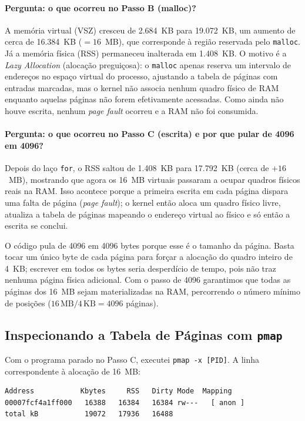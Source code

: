 \documentclass[11pt,a4paper]{article}
\begin{document}
\paragraph{Pergunta: o que ocorreu no Passo B (malloc)?}
A memória virtual (VSZ) cresceu de 2.684~KB para 19.072~KB, um aumento de cerca de 16.384~KB
($=16$~MB), que corresponde à região reservada pelo \texttt{malloc}. Já a memória física (RSS)
permaneceu inalterada em 1.408~KB. O motivo é a \emph{Lazy Allocation} (alocação preguiçosa): o
\texttt{malloc} apenas reserva um intervalo de endereços no espaço virtual do processo, ajustando a
tabela de páginas com entradas marcadas, mas o kernel não associa nenhum quadro físico de RAM
enquanto aquelas páginas não forem efetivamente acessadas. Como ainda não houve escrita, nenhum
\emph{page fault} ocorreu e a RAM não foi consumida.

\paragraph{Pergunta: o que ocorreu no Passo C (escrita) e por que pular de 4096 em 4096?}
Depois do laço \texttt{for}, o RSS saltou de 1.408~KB para 17.792~KB (cerca de $+16$~MB), mostrando
que agora os 16~MB virtuais passaram a ocupar quadros físicos reais na RAM. Isso acontece porque a
primeira escrita em cada página dispara uma falta de página (\emph{page fault}); o kernel então
aloca um quadro físico livre, atualiza a tabela de páginas mapeando o endereço virtual ao físico e
só então a escrita se conclui.

O código pula de 4096 em 4096 bytes porque esse é o tamanho da página. Basta tocar um único byte de
cada página para forçar a alocação do quadro inteiro de 4~KB; escrever em todos os bytes seria
desperdício de tempo, pois não traz nenhuma página física adicional. Com o passo de 4096 garantimos
que todas as páginas dos 16~MB sejam materializadas na RAM, percorrendo o número mínimo de posições
($16\,\text{MB}/4\,\text{KB}=4096$ páginas).

\subsection{Inspecionando a Tabela de Páginas com \texttt{pmap}}

Com o programa parado no Passo C, executei \texttt{pmap -x [PID]}. A linha correspondente à alocação
de 16~MB:

\begin{lstlisting}[style=bashstyle]
Address           Kbytes     RSS   Dirty Mode  Mapping
00007fcf4a1ff000   16388   16384   16384 rw---   [ anon ]
total kB           19072   17936   16488
\end{lstlisting}
\end{document}
